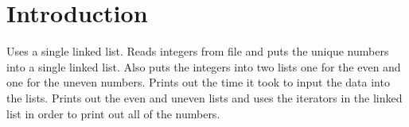 \hypertarget{index_intro_sec}{}\section{Introduction}\label{index_intro_sec}
Uses a single linked list. Reads integers from file and puts the unique numbers into a single linked list. Also puts the integers into two lists one for the even and one for the uneven numbers. Prints out the time it took to input the data into the lists. Prints out the even and uneven lists and uses the iterators in the linked list in order to print out all of the numbers. 